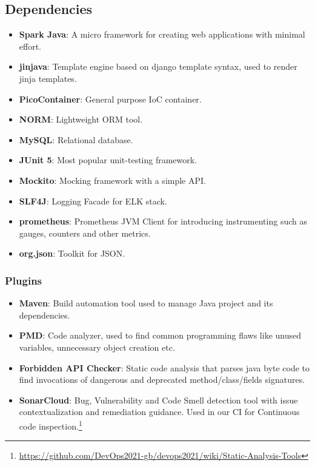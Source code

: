 \subsection{Dependencies }
\begin{itemize}
    \item \textbf{Spark Java}: A micro framework for creating web applications with minimal effort. %
    \item \textbf{jinjava}: Template engine based on django template syntax, used to render jinja templates.
    \item \textbf{PicoContainer}: General purpose IoC container.
    \item \textbf{NORM}: Lightweight ORM tool. %
    \item \textbf{MySQL}: Relational database.%
    \item \textbf{JUnit 5}: Most popular unit-testing framework.
    \item \textbf{Mockito}: Mocking framework with a simple API.
    \item \textbf{SLF4J}: Logging Facade for ELK stack. 
    \item \textbf{prometheus}: Prometheus JVM Client for introducing instrumenting such as gauges, counters and other metrics.
    \item \textbf{org.json}: Toolkit for JSON.
\end{itemize}
\subsubsection{Plugins}
\begin{itemize}
    \item \textbf{Maven}: Build automation tool used to manage Java project and its dependencies.
    \item \textbf{PMD}: Code analyzer, used to find common programming flaws like unused variables, unnecessary object creation etc. 
    \item \textbf{Forbidden API Checker}: Static code analysis that parses java byte code to find invocations of dangerous and deprecated method/class/fields signatures. 
    \item \textbf{SonarCloud}: Bug, Vulnerability and Code Smell detection tool with issue contextualization and remediation guidance. Used in our CI for Continuous code inspection.\footnote{\url{https://github.com/DevOps2021-gb/devops2021/wiki/Static-Analysis-Tools}}
\end{itemize}

